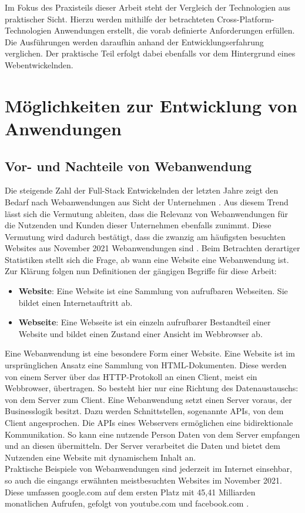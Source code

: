 \documentclass[a4paper]{scrartcl}
\begin{document}
 Im Fokus des Praxisteils dieser Arbeit steht der Vergleich der Technologien aus praktischer Sicht. Hierzu werden mithilfe der betrachteten Cross-Platform-Technologien Anwendungen erstellt, die vorab definierte Anforderungen erfüllen. Die Ausführungen werden daraufhin anhand der Entwicklungserfahrung verglichen. Der praktische Teil erfolgt dabei ebenfalls vor dem Hintergrund eines Webentwickelnden.  

\newpage

\section{Möglichkeiten zur Entwicklung von Anwendungen}

\subsection{Vor- und Nachteile von Webanwendung}

Die steigende Zahl der Full-Stack Entwickelnden der letzten Jahre zeigt den Bedarf nach Webanwendungen aus Sicht der Unternehmen \autocite{stackoverflow_2020}. Aus diesem Trend lässt sich die Vermutung ableiten, dass die Relevanz von Webanwendungen für die Nutzenden und Kunden dieser Unternehmen ebenfalls zunimmt. Diese Vermutung wird dadurch bestätigt, dass die zwanzig am häufigsten besuchten Websites aus November 2021 Webanwendungen sind \autocite{Clement}. Beim Betrachten derartiger Statistiken stellt sich die Frage, ab wann eine Website eine Webanwendung ist. Zur Klärung folgen nun Definitionen der gängigen Begriffe für diese Arbeit: 

\begin{itemize}
	\item[] \textbf{Website}: Eine Website ist eine Sammlung von aufrufbaren Webseiten. Sie bildet einen Internetauftritt ab.
	\item[] \textbf{Webseite}: Eine Webseite ist ein einzeln aufrufbarer Bestandteil einer Website und bildet einen Zustand einer Ansicht im Webbrowser ab.
\end{itemize}

Eine Webanwendung ist eine besondere Form einer Website. Eine Website ist im ursprünglichen Ansatz eine Sammlung von HTML-Dokumenten. Diese werden von einem Server über das HTTP-Protokoll an einen Client, meist ein Webbrowser, übertragen. So besteht hier nur eine Richtung des Datenaustauschs: von dem Server zum Client. Eine Webanwendung setzt einen Server voraus, der Businesslogik besitzt. Dazu werden Schnittstellen, sogenannte APIs, von dem Client angesprochen. Die APIs eines Webservers ermöglichen eine bidirektionale Kommunikation. So kann eine nutzende Person Daten von dem Server empfangen und an diesen übermitteln. Der Server verarbeitet die Daten und bietet dem Nutzenden eine Website mit dynamischem Inhalt an. \\
Praktische Beispiele von Webanwendungen sind jederzeit im Internet einsehbar, so auch die eingangs erwähnten meistbesuchten Websites im November 2021. Diese umfassen google.com auf dem ersten Platz mit 45,41 Milliarden monatlichen Aufrufen, gefolgt von youtube.com und facebook.com \autocite{Clement}. \\
\end{document}
